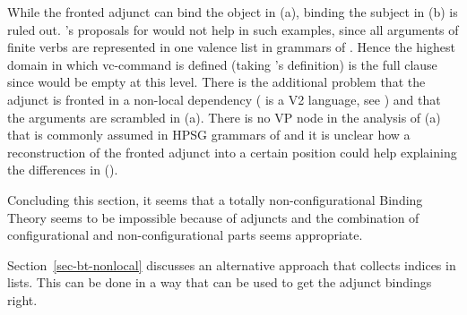 \documentclass[output=paper,biblatex,babelshorthands,newtxmath,draftmode,colorlinks,citecolor=brown]{langscibook}
\begin{document}
While the fronted adjunct can bind the object in (a), binding the subject in (b) is
ruled out. \citeauthor{Walker2011a}'s proposals for  would not help in such examples, since all arguments of
finite verbs are represented in one valence list in grammars of . Hence the highest domain in
which vc-command is defined (taking \citeauthor{HL95b}'s definition) is the full clause since \comps
would be empty at this level. There is the additional problem that the adjunct is fronted in a
non-local dependency ( is a V2 language, see \cites[Chapter~2.4]{Erdmann1886a}[, ]{Paul1919a}[Section~3]{MuellerGermanHandbook}) and that the arguments are scrambled in
(a). There is no VP node in the analysis of (a) that is commonly assumed in HPSG
grammars of  and it is unclear how a reconstruction of the fronted adjunct into a certain
position could help explaining the differences in ().




Concluding this section, it seems that a totally non-configurational Binding Theory seems to be
impossible because of adjuncts and the combination of configurational and non-configurational parts
seems appropriate. 

Section~\ref{sec-bt-nonlocal} discusses an alternative approach that collects indices in lists. This can be done in a
way that can be used to get the adjunct bindings right.
 
\end{document}

